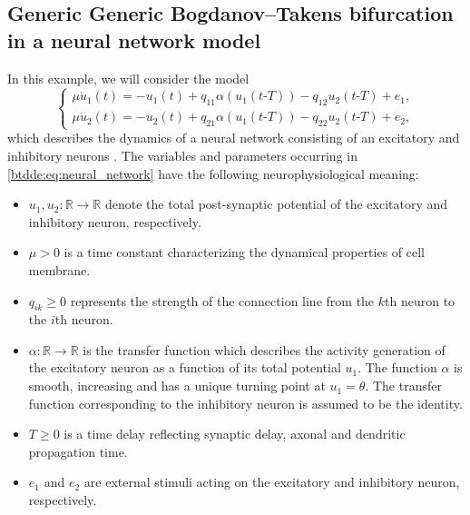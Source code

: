 \subsection{\ifthesis \phantom{ } \fi Generic Generic Bogdanov--Takens bifurcation in a neural network model}
In this example, we will consider the model 
\begin{equation}
\label{btdde:eq:neural_network}
\begin{cases}
\mu\dot{u}_1(t) = -u_1(t) + q_{11}\alpha(u_1(t\text{-}T))-q_{12}u_2(t\text{-}T) + e_1,\\
\mu\dot{u}_2(t) = -u_2(t) + q_{21}\alpha(u_1(t\text{-}T))-q_{22}u_2(t\text{-}T) + e_2,
\end{cases}
\end{equation}
which describes the dynamics of a neural network consisting of an
excitatory and inhibitory neurons \cite{giannakopoulos2001bifurcations}.
The variables and parameters occurring in \cref{btdde:eq:neural_network}
have the following neurophysiological meaning:
\begin{itemize}
\item $u_1,u_2:\mathbb{R}\rightarrow\mathbb{R}$ denote the total post-synaptic
potential of the excitatory and inhibitory neuron, respectively.
\item $\mu>0$ is a time constant characterizing the dynamical properties
of cell membrane.
\item $q_{ik}\geq0$ represents the strength of the connection line from
the $k$th neuron to the $i$th neuron.
\item $\alpha:\mathbb{R}\rightarrow\mathbb{R}$ is the transfer function
which describes the activity generation of the excitatory neuron as
a function of its total potential $u_1$. The function $\alpha$
is smooth, increasing and has a unique turning point at $u_1 = \theta$.
The transfer function corresponding to the inhibitory neuron is assumed
to be the identity.
\item $T\geq0$ is a time delay reflecting synaptic delay, axonal and dendritic
propagation time.
\item $e_1$ and $e_2$ are external stimuli acting on the excitatory
and inhibitory neuron, respectively.
\end{itemize}

